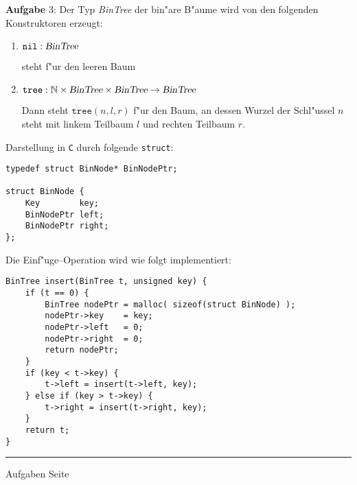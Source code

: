 
\begin{slide}{}
\normalsize

\begin{center}
\end{center}
\vspace*{0.5cm}

\tiny
\textbf{Aufgabe} 3: Der Typ \textsl{BinTree} der bin"are B"aume wird von den folgenden
Konstruktoren erzeugt:
\begin{enumerate}
\item $\mathtt{nil}: \textsl{BinTree}$

      steht f"ur den leeren Baum
\item $\mathtt{tree}: \mathbb{N} \times \textsl{BinTree} \times \textsl{BinTree} \rightarrow \textsl{BinTree}$

      Dann steht $\mathtt{tree}(n, l, r)$ f"ur den Baum, an dessen Wurzel der Schl"ussel $n$
      steht mit linkem Teilbaum $l$ und rechten Teilbaum $r$.
\end{enumerate}
Darstellung in \texttt{C} durch folgende \texttt{struct}:
\begin{verbatim}
typedef struct BinNode* BinNodePtr;

struct BinNode {
    Key        key;
    BinNodePtr left;
    BinNodePtr right;
};
\end{verbatim}
Die Einf"uge--Operation wird wie folgt implementiert:
\begin{verbatim}
BinTree insert(BinTree t, unsigned key) {
    if (t == 0) {
        BinTree nodePtr = malloc( sizeof(struct BinNode) );
        nodePtr->key    = key;
        nodePtr->left   = 0;
        nodePtr->right  = 0;
        return nodePtr;
    }
    if (key < t->key) {
        t->left = insert(t->left, key);
    } else if (key > t->key) {
        t->right = insert(t->right, key);
    }
    return t;
}
\end{verbatim}


\vspace*{\fill}
\tiny \addtocounter{mypage}{1}
\rule{17cm}{1mm}
Aufgaben  \hspace*{\fill} Seite 
\end{slide}


